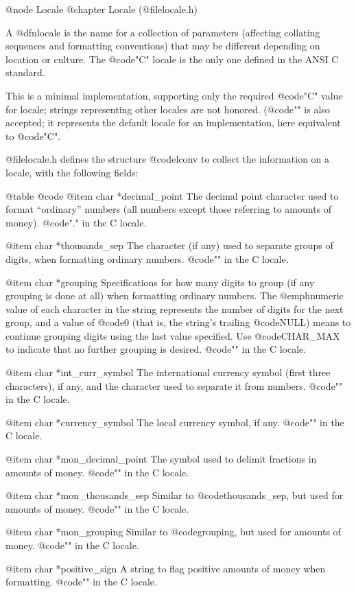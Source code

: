 @node Locale
@chapter Locale (@file{locale.h})

A @dfn{locale} is the name for a collection of parameters (affecting
collating sequences and formatting conventions) that may be different
depending on location or culture.  The @code{"C"} locale is the only
one defined in the ANSI C standard.

This is a minimal implementation, supporting only the required @code{"C"}
value for locale; strings representing other locales are not
honored.  (@code{""} is also accepted; it represents the default locale
for an implementation, here equivalent to @code{"C"}.


@file{locale.h} defines the structure @code{lconv} to collect the
information on a locale, with the following fields:

@table @code
@item char *decimal_point
The decimal point character used to format ``ordinary'' numbers (all
numbers except those referring to amounts of money).  @code{"."} in the
C locale.

@item char *thousands_sep
The character (if any) used to separate groups of digits, when
formatting ordinary numbers.
@code{""} in the C locale.

@item char *grouping
Specifications for how many digits to group (if any grouping is done at
all) when formatting ordinary numbers.  The @emph{numeric value} of each
character in the string represents the number of digits for the next
group, and a value of @code{0} (that is, the string's trailing
@code{NULL}) means to continue grouping digits using the last value
specified.  Use @code{CHAR_MAX} to indicate that no further grouping is
desired.  @code{""} in the C locale.

@item char *int_curr_symbol
The international currency symbol (first three characters), if any, and
the character used to separate it from numbers.
@code{""} in the C locale.

@item char *currency_symbol
The local currency symbol, if any.
@code{""} in the C locale.

@item char *mon_decimal_point
The symbol used to delimit fractions in amounts of money.
@code{""} in the C locale.

@item char *mon_thousands_sep
Similar to @code{thousands_sep}, but used for amounts of money.
@code{""} in the C locale.

@item char *mon_grouping
Similar to @code{grouping}, but used for amounts of money.
@code{""} in the C locale.

@item char *positive_sign
A string to flag positive amounts of money when formatting.
@code{""} in the C locale.


